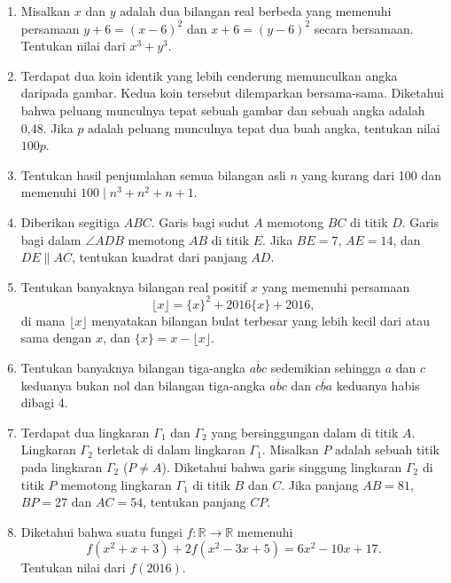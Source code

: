 \documentclass[a4paper, 12pt]{article}
\begin{document}
\begin{enumerate}

\item Misalkan $x$ dan $y$ adalah dua bilangan real berbeda yang memenuhi persamaan $y+6=(x-6)^2$ dan $x+6=(y-6)^2$ secara bersamaan. Tentukan nilai dari $x^3+y^3$.

\item Terdapat dua koin identik yang lebih cenderung memunculkan angka daripada gambar. Kedua koin tersebut dilemparkan bersama-sama. Diketahui bahwa peluang munculnya tepat sebuah gambar dan sebuah angka adalah 0,48. Jika $p$ adalah peluang munculnya tepat dua buah angka, tentukan nilai $100p$.

\item Tentukan hasil penjumlahan semua bilangan asli $n$ yang kurang dari 100 dan memenuhi $100\mid n^3+n^2+n+1$.

\item Diberikan segitiga $ABC$. Garis bagi sudut $A$ memotong $BC$ di titik $D$. Garis bagi dalam $\angle ADB$ memotong $AB$ di titik $E$. Jika $BE=7$, $AE=14$, dan $DE\parallel AC$, tentukan kuadrat dari panjang $AD$.

\item  Tentukan banyaknya bilangan real positif $x$ yang memenuhi persamaan \[\lfloor{x}\rfloor=\{x\}^2+2016\{x\}+2016,\] di mana $\lfloor{x}\rfloor$ menyatakan bilangan bulat terbesar yang lebih kecil dari atau sama dengan $x$, dan $\{x\}=x-\lfloor{x}\rfloor$.

\item Tentukan banyaknya bilangan tiga-angka $\overline{abc}$ sedemikian sehingga $a$ dan $c$ keduanya bukan nol dan bilangan tiga-angka $\overline{abc}$ dan $\overline{cba}$ keduanya habis dibagi 4.

\item Terdapat dua lingkaran $\Gamma_{1}$ dan $\Gamma_{2}$ yang bersinggungan dalam di titik $A$. Lingkaran $\Gamma_{2}$ terletak di dalam lingkaran $\Gamma_{1}$. Misalkan $P$ adalah sebuah titik pada lingkaran $\Gamma_{2}$ ($P\neq A$). Diketahui bahwa garis singgung lingkaran $\Gamma_{2}$ di titik $P$ memotong lingkaran $\Gamma_{1}$ di titik $B$ dan $C$. Jika panjang $AB=81$, $BP=27$ dan $AC=54$, tentukan panjang $CP$.

\item Diketahui bahwa suatu fungsi $f: \mathbb{R} \rightarrow \mathbb{R}$ memenuhi \[ f(x^2+x+3)+2f(x^2-3x+5) = 6x^2-10x+17. \] Tentukan nilai dari $f(2016)$.


\end{enumerate}
\end{document}
